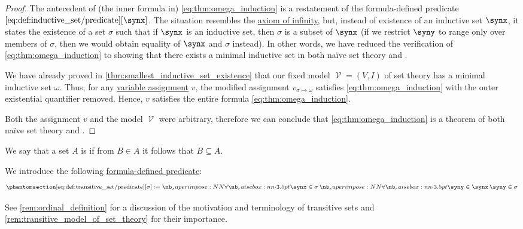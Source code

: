 \begin{proof}
  The antecedent of (the inner formula in) \eqref{eq:thm:omega_induction} is a restatement of the formula-defined predicate \( \ref{eq:def:inductive_set/predicate}[\synx] \). The situation resembles the \hyperref[eq:def:zfc/infinity]{axiom of infinity}, but, instead of existence of an inductive set \( \synx \), it states the existence of a set \( \sigma \) such that if \( \synx \) is an inductive set, then \( \sigma \) is a subset of \( \synx \) (if we restrict \( \syny \) to range only over members of \( \sigma \), then we would obtain equality of \( \synx \) and \( \sigma \) instead). In other words, we have reduced the verification of \eqref{eq:thm:omega_induction} to showing that there exists a minimal inductive set in both na\"ive set theory and .

  We have already proved in \cref{thm:smallest_inductive_set_existence} that our fixed model \( \mscrV = (V, I) \) of set theory has a minimal inductive set \( \omega \). Thus, for any \hyperref[def:first_order_valuation/variable_assignment]{variable assignment} \( v \), the modified assignment \( v_{\sigma \mapsto \omega} \) satisfies \eqref{eq:thm:omega_induction} with the outer existential quantifier removed. Hence, \( v \) satisfies the entire formula \eqref{eq:thm:omega_induction}.

  Both the assignment \( v \) and the model \( \mscrV \) were arbitrary, therefore we can conclude that \eqref{eq:thm:omega_induction} is a theorem of both na\"ive set theory and .
\end{proof}

\begin{definition}\label{def:transitive_set}
  We say that a set \( A \) is  if from \( B \in A \) it follows that \( B \subseteq A \).

  We introduce the following \hyperref[con:formula_defined_predicate]{formula-defined predicate}:
  \begin{equation*}\taglabel[\op{IsSetTransitive}]{eq:def:transitive_set/predicate}
    \ref{eq:def:transitive_set/predicate}[\sigma] \coloneqq \qforall {\synx \in \sigma} \qforall {\syny \in \synx} {\syny \in \sigma}
  \end{equation*}
\end{definition}
\begin{comments}
  \item See \cref{rem:ordinal_definition} for a discussion of the motivation and terminology of transitive sets and \cref{rem:transitive_model_of_set_theory} for their importance.
\end{comments}

